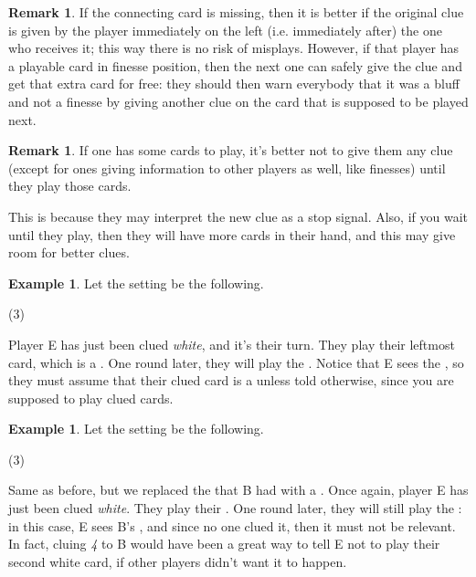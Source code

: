 \documentclass[a4paper]{article}
\theoremstyle{plain}
\theoremstyle{definition}
\newtheorem{remark}[theorem]{Remark}
\newtheorem{example}[theorem]{Example}
\begin{document}
\begin{remark}
	If the connecting card is missing, then it is better if the original clue is given by the player immediately on the left (i.e. immediately after) the one who receives it; this way there is no risk of misplays. However, if that player has a playable card in finesse position, then the next one can safely give the clue and get that extra card for free: they should then warn everybody that it was a bluff and not a finesse by giving another clue on the card that is supposed to be played next.
\end{remark}

\begin{remark}
	If one has some cards to play, it's better not to give them any clue (except for ones giving information to other players as well, like finesses) until they play those cards.
\end{remark}

This is because they may interpret the new clue as a stop signal. Also, if you wait until they play, then they will have more cards in their hand, and this may give room for better clues.

\begin{example}
	
	Let the setting be the following.
	
	\begin{tasks}(3)
		\task[+]      
		\task[A]    
		\task[B]    
		\task[C]    
		\task[D]    
		\task[E]    
	\end{tasks}

	Player E has just been clued \textit{white}, and it's their turn. They play their leftmost card, which is a . One round later, they will play the . Notice that E sees the , so they must assume that their clued card is a  unless told otherwise, since you are supposed to play clued cards.

\end{example}

\begin{example}
	
	Let the setting be the following.
	
	\begin{tasks}(3)
		\task[+]      
		\task[A]    
		\task[B]    
		\task[C]    
		\task[D]    
		\task[E]    
	\end{tasks}
	
	Same as before, but we replaced the  that B had with a . Once again, player E has just been clued \textit{white}. They play their . One round later, they will still play the : in this case, E sees B's , and since no one clued it, then it must not be relevant. In fact, cluing \textit{4} to B would have been a great way to tell E not to play their second white card, if other players didn't want it to happen.
	
\end{example}
\end{document}

